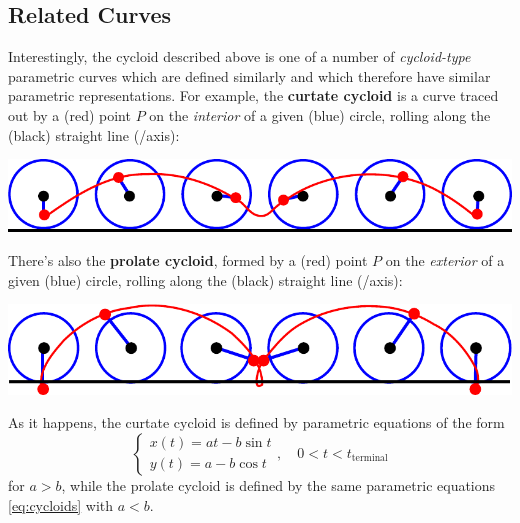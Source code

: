 \documentclass[12pt]{article}
\begin{document}
	\subsection*{Related Curves}
	Interestingly, the cycloid described above is one of a number of \textit{cycloid-type} parametric curves which are defined similarly and which therefore have similar parametric representations. For example, the \textbf{curtate cycloid} is a curve traced out by a (red) point $P$ on the \textit{interior} of a given (blue) circle, rolling along the (black) straight line (/axis):
	
	\begin{center}
		\includegraphics[trim={0 -3mm 0 -3mm}, clip, scale=1]{5_Cycloids3}
	\end{center}

	There's also the \textbf{prolate cycloid}, formed by a (red) point $P$ on the \textit{exterior} of a given (blue) circle, rolling along the (black) straight line (/axis):
	
	\begin{center}
		\includegraphics[trim={0 -3mm 0 -3mm}, clip, scale=1]{5_Cycloids4}
	\end{center}

	\noindent As it happens, the curtate cycloid is defined by parametric equations of the form
	\begin{equation}
	\label{eq:cycloids}
	\left\{
		\begin{array}{l}
		x(t)=at-b\sin{t}\\
		y(t)=a-b\cos{t}
		\end{array}
	\right.,\quad0 < t < t_{\text{terminal}}\end{equation}
	for $a>b$, while the prolate cycloid is defined by the same parametric equations \eqref{eq:cycloids} with $a<b$.
	
\end{document}
